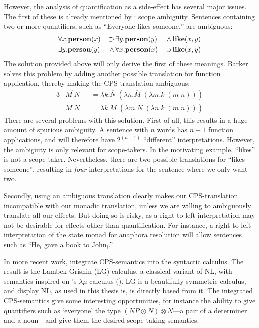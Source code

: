\documentclass[a4paper]{article}
\begin{document}
However, the analysis of quantification as a side-effect has several
major issues. The first of these is already mentioned by
\citet{barker2004}: scope ambiguity. Sentences containing two or
more quantifiers, such as ``Everyone likes someone,'' are ambiguous:
\begin{alignat*}{3}
  &\forall x.\mathbf{person}(x) \,&\supset \,&\exists y.\mathbf{person}(y) \,&\wedge  \,&\mathbf{like}(x,y)\\
  &\exists y.\mathbf{person}(y) \,&\wedge  \,&\forall x.\mathbf{person}(x) \,&\supset \,&\mathbf{like}(x,y)
\end{alignat*}
The solution provided above will only derive the first of these
meanings. Barker solves this problem by adding another possible
translation for function application, thereby making the
CPS-translation ambiguous:
\begin{alignat*}{3}
  &\overline{M\;N} &&= \lambda k. \overline{N}\;(\lambda
  n.\overline{M}\;(\lambda m.k\;(m\;n)))\\
  &\overline{M\;N} &&= \lambda k. \overline{M}\;(\lambda
  m.\overline{N}\;(\lambda n.k\;(m\;n)))
\end{alignat*}
There are several problems with this solution. First of all, this
results in a huge amount of spurious ambiguity. A sentence with $n$
words has $n-1$ function applications, and will therefore have
$2^{(n-1)}$ ``different'' interpretations. However, the ambiguity is
only relevant for scope-takers. In the motivating example, ``likes''
is not a scope taker. Nevertheless, there are two possible
translations for ``likes someone'', resulting in \emph{four}
interpretations for the sentence where we only want two.

Secondly, using an ambiguous translation clearly makes our
CPS-translation incompatible with our monadic translation, unless we
are willing to ambiguously translate all our effects. But doing so is
risky, as a right-to-left interpretation may not be desirable for
effects other than quantification. For instance, a right-to-left
interpretation of the state monad for anaphora resolution will allow
sentences such as ``He$_i$ gave a book to John$_i$.''

\vspace*{1\baselineskip}

In more recent work, \citet{moortgat2012} integrate CPS-semantics into
the syntactic calculus. The result is the Lambek-Grishin (LG)
calculus, a classical variant of NL, with semantics inspired on
\citeauthor{parigot1992}'s $\lambda\mu$-calculus
(\citeyear{parigot1992}). LG is a beautifully symmetric calculus, and
display NL, as used in this thesis is, is directly based from it. The
integrated CPS-semantics give some interesting opportunities, for
instance the ability to give quantifiers such as `everyone' the type
$(NP\oslash N)\otimes N$---a pair of a determiner and a noun---and
give them the desired scope-taking semantics.
\end{document}
